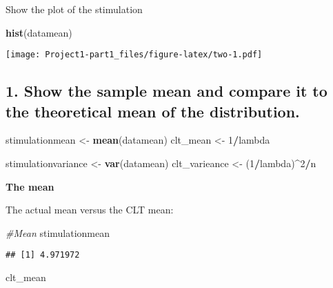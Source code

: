 \documentclass[
]{article}
\newenvironment{Shaded}{\begin{snugshade}}{\end{snugshade}}
\newcommand{\CommentTok}[1]{\textcolor[rgb]{0.56,0.35,0.01}{\textit{#1}}}
\newcommand{\DecValTok}[1]{\textcolor[rgb]{0.00,0.00,0.81}{#1}}
\newcommand{\KeywordTok}[1]{\textcolor[rgb]{0.13,0.29,0.53}{\textbf{#1}}}
\newcommand{\NormalTok}[1]{#1}
\newcommand{\OperatorTok}[1]{\textcolor[rgb]{0.81,0.36,0.00}{\textbf{#1}}}
\newcommand{\StringTok}[1]{\textcolor[rgb]{0.31,0.60,0.02}{#1}}
\begin{document}
Show the plot of the stimulation

\begin{Shaded}
\begin{Highlighting}[]
\KeywordTok{hist}\NormalTok{(datamean)}
\end{Highlighting}
\end{Shaded}

\texttt{[image: Project1-part1\_files/figure-latex/two-1.pdf]}

\hypertarget{show-the-sample-mean-and-compare-it-to-the-theoretical-mean-of-the-distribution.}{%
\subsection{1. Show the sample mean and compare it to the theoretical
mean of the
distribution.}\label{show-the-sample-mean-and-compare-it-to-the-theoretical-mean-of-the-distribution.}}

\begin{Shaded}
\begin{Highlighting}[]
\NormalTok{stimulationmean <-}\StringTok{ }\KeywordTok{mean}\NormalTok{(datamean)}
\NormalTok{clt_mean <-}\StringTok{ }\DecValTok{1}\OperatorTok{/}\NormalTok{lambda}


\NormalTok{stimulationvariance <-}\StringTok{ }\KeywordTok{var}\NormalTok{(datamean)}
\NormalTok{clt_varieance <-}\StringTok{ }\NormalTok{(}\DecValTok{1}\OperatorTok{/}\NormalTok{lambda)}\OperatorTok{^}\DecValTok{2}\OperatorTok{/}\NormalTok{n}
\end{Highlighting}
\end{Shaded}

\textbf{The mean}

The actual mean versus the CLT mean:

\begin{Shaded}
\begin{Highlighting}[]
\CommentTok{#Mean}
\NormalTok{stimulationmean}
\end{Highlighting}
\end{Shaded}

\begin{verbatim}
## [1] 4.971972
\end{verbatim}

\begin{Shaded}
\begin{Highlighting}[]
\NormalTok{clt_mean}
\end{Highlighting}
\end{Shaded}
\end{document}
